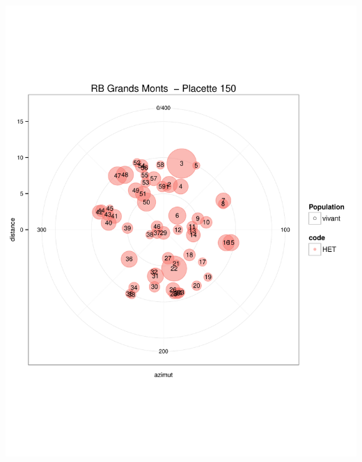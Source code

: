 \documentclass[a4paper]{book}\usepackage[]{graphicx}\usepackage[]{color}
\makeatletter
\def\maxwidth{ %
  \ifdim\Gin@nat@width>\linewidth
    \linewidth
  \else
    \Gin@nat@width
  \fi
}
\newenvironment{knitrout}{}{} %
\makeatother
\begin{document}
\begin{knitrout}
{\centering \includegraphics[width=\maxwidth]{Figures/PlanArbres-14} 

}





\end{knitrout}
\end{document}
